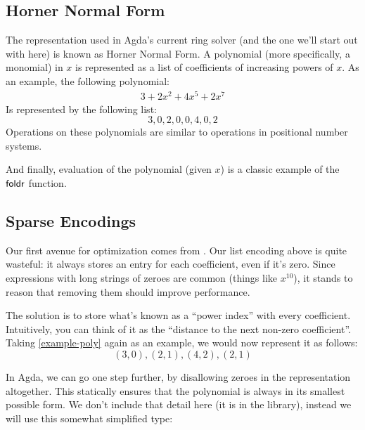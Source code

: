 \documentclass[acmsmall,review,anonymous]{acmart}\settopmatter{printfolios=true,printccs=false,printacmref=false}
\begin{document}
\subsection{Horner Normal Form}
The representation used in Agda's current ring solver (and the one we'll start
out with here) is known as Horner Normal Form. A polynomial (more specifically,
a monomial) in \(x\) is represented as a list of coefficients of increasing
powers of \(x\). As an example, the following polynomial:
\begin{align}
  3 + 2x^2 + 4x^5 + 2x^7 \label{example-poly}
\end{align}
Is represented by the following list:
\[3, 0, 2, 0, 0, 4, 0, 2\]
Operations on these polynomials are similar to operations in positional number
systems.
\begin{center}
\end{center}
And finally, evaluation of the polynomial (given \(x\)) is a classic example of
the \(\AgdaFunction{foldr}\) function.
\begin{center}
\end{center}
\subsection{Sparse Encodings}
Our first avenue for optimization comes from \citet{gregoire_proving_2005}. Our
list encoding above is quite wasteful: it always stores an entry for each
coefficient, even if it's zero. Since expressions with long strings of zeroes
are common (things like \(x^{10}\)), it stands to reason that removing them
should improve performance.

The solution is to store what's known as a ``power index'' with every
coefficient. Intuitively, you can think of it as the ``distance to the next
non-zero coefficient''. Taking \ref{example-poly} again as an example, we would
now represent it as follows:
\[ (3,0),(2,1),(4,2),(2,1) \]

In Agda, we can go one step further, by disallowing zeroes in the representation
altogether. This statically ensures that the polynomial is always in its
smallest possible form. We don't include that detail here (it is in the
library), instead we will use this somewhat simplified type:
\begin{center}
\end{center}
\end{document}
